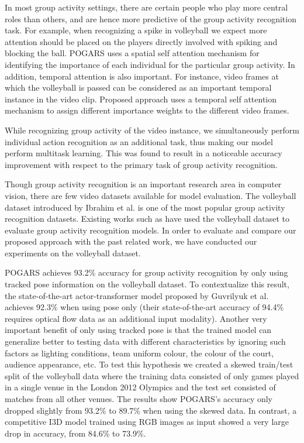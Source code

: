 \documentclass[a4paper,fleqn]{cas-dc}
\begin{document}
In most group activity settings, there are certain people who play more central roles than others, and are hence more predictive of the group activity recognition task. 
For example, when recognizing a spike in volleyball we expect more attention should be placed on the players directly involved with spiking and blocking the ball. 
POGARS uses a spatial self attention mechanism for identifying the importance of each individual for the particular group activity. In addition, temporal attention is also important. 
For instance, video frames at which the volleyball is passed can be considered as an important temporal instance in the video clip. 
Proposed approach uses a temporal self attention mechanism to assign different importance weights to the different video frames.

While recognizing group activity of the video instance, we simultaneously perform individual action recognition as an additional task, thus making our model perform multitask learning. 
This was found to result in a noticeable accuracy improvement with respect to the primary task of group activity recognition.

Though group activity recognition is an important research area in computer vision, there are  few video datasets available for model evaluation. 
The volleyball dataset introduced by Ibrahim et al.\cite{Ibrahim2015_volleyballPaper} is one of the most popular  group activity recognition datasets. 
Existing works such as \cite{Ibrahim2016_hierarchical_deep,Azar2018_multistream,Azar2019_convoRelational,Lu2019_spatioTempAtt} have used the volleyball dataset to evaluate group activity recognition models. 
In order to evaluate and compare our proposed approach with the past related work, we have conducted our experiments on  the volleyball dataset.

POGARS achieves 93.2\% accuracy for group activity recognition by only using tracked pose information on the volleyball dataset. 
To contextualize this result, the state-of-the-art actor-transformer model proposed by Guvrilyuk et al.\cite{Gavrilyuk2020_ActorTransformer} achieves 92.3\% when using pose only (their state-of-the-art accuracy of 94.4\% requires optical flow data as an additional input modality).
Another very important benefit of  only using tracked pose is that the trained model can generalize better to testing data with different characteristics by ignoring such factors as lighting conditions, team uniform colour, the colour of the court, audience appearance, etc.
To test this hypothesis we created a skewed train/test split of the volleyball data where the training data consisted of only games played in a single venue in the London 2012 Olympics and the test set consisted of matches from all other venues. 
The results show POGARS's accuracy only dropped slightly from 93.2\% to 89.7\% when using the skewed data. 
In contrast, a competitive I3D model \cite{Carreira2017_kinetics} trained using RGB images as input showed a very large drop in accuracy, from 84.6\% to 73.9\%.
\end{document}
